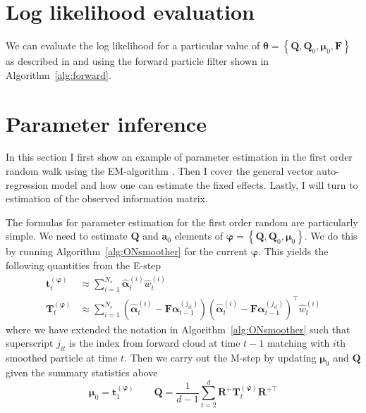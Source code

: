 \documentclass[notitlepage]{article}
\renewcommand{\vec}[1]{\bm{#1}}
\newcommand{\mat}[1]{\mathbf{#1}}
\newcommand{\Lbrace}[1]{\left\{ #1\right\}}
\newcommand{\Lparen}[1]{\left( #1\right)}
\newcommand{\partic}[3]{#1_{#2}^{\Lparen{#3}}}
\newcommand{\particS}[3]{\widehat{#1}_{#2}^{\Lparen{#3}}}
\newcommand{\nPart}{N}
\newcommand{\nPeriods}{d}
\begin{document}
\section{Log likelihood evaluation}
We can evaluate the log likelihood for a particular value of $\vec{\theta} = \Lbrace{\mat{Q}, \mat{Q}_0, \vec \mu_0, \mat{F}}$ as described in \citet[page 5]{doucet09} and \citet[page 193]{malik11} using the forward particle filter shown in Algorithm~\ref{alg:forward}.

\section{Parameter inference}
In this section I first show an example of parameter estimation in the first 
order random walk using the EM-algorithm \citep{dempster77}. Then I cover the 
general vector auto-regression model and how one can estimate the fixed 
effects. Lastly, I will turn to estimation of the observed information matrix. 

The formulas for parameter estimation for the first order random are particularly simple. We need to estimate $\mat{Q}$ and $\vec{a}_0$ elements of $\vec{\varphi} = \Lbrace{\mat{Q}, \mat{Q}_0, \vec\mu_0}$. We do this by running Algorithm~\ref{alg:ONsmoother} for the current $\vec{\varphi}$. This yields the following quantities from the E-step%
%
\begin{equation}\begin{split}
\vec{t}_t^{(\vec{\varphi})} &\approx \sum_{i = 1}^{\nPart_s} \particS{\vec{\alpha}}{t}{i} \particS{w}{t}{i} \\
%
\vec{T}_t^{(\vec{\varphi})} & \approx \sum_{i = 1}^{\nPart_s}
	\Lparen{\particS{\vec{\alpha}}{t}{i} - \mat{F}\partic{\vec{\alpha}}{t-1}{j_{it}}}
	\Lparen{\particS{\vec{\alpha}}{t}{i} - \mat{F}\partic{\vec{\alpha}}{t-1}{j_{it}}}^\top
	\particS{w}{t}{i}
\end{split}\end{equation}%
%
%
where  we have extended the notation in Algorithm~\ref{alg:ONsmoother} such that superscript $j_{it}$ is the index from forward cloud at time $t-1$ matching with $i$th smoothed particle at time $t$.
Then we carry out the M-step by updating $\vec\mu_0$ and $\mat{Q}$ given the summary statistics above%
%
\begin{equation}
\vec\mu_0 = \vec{t}_1^{(\vec{\varphi})} \qquad
%
\mat{Q} = \frac{1}{\nPeriods - 1}\sum_{t = 2}^\nPeriods \mat{R}^+\vec{T}_t^{(\vec{\varphi})}\mat{R}^{+\top}
\end{equation}%
\end{document}
